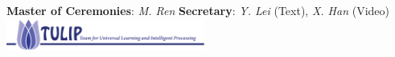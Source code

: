 \documentclass{article}
\begin{document}

\smallbreak
{\scshape }
%
\smallbreak
\footnotesize{
\textbf{Master of Ceremonies}: \textit{M. Ren}
\textbf{Secretary}: \textit{Y. Lei} (Text), \textit{X. Han} (Video)
}
\smallbreak
\includegraphics[width=6.5cm]{logos/tulip-wordmark.eps}
\end{document}
